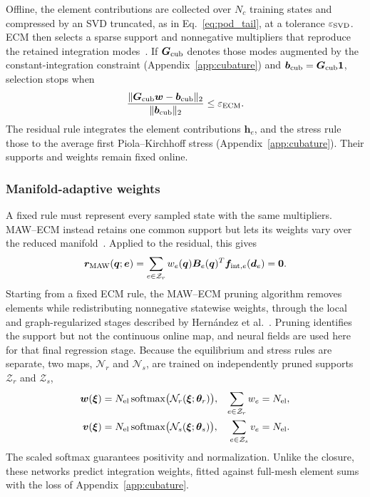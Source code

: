 Offline, the element contributions are collected over $N_c$ training states and compressed by an SVD truncated, as in Eq.~\eqref{eq:pod_tail}, at a tolerance $\varepsilon_{\rm SVD}$. ECM then selects a sparse support and nonnegative multipliers that reproduce the retained integration modes~\cite{hernandez2017}. If $\bm G_{\rm cub}$ denotes those modes augmented by the constant-integration constraint (Appendix~\ref{app:cubature}) and $\bm b_{\rm cub}=\bm G_{\rm cub}\bm1$, selection stops when
\begin{equation}
 \frac{\|\bm G_{\rm cub}\bm w-\bm b_{\rm cub}\|_2}
      {\|\bm b_{\rm cub}\|_2}\leq\varepsilon_{\rm ECM}.
 \label{eq:ecm_tolerance}
\end{equation}
The residual rule integrates the element contributions $\bm h_e$, and the stress rule those to the average first Piola--Kirchhoff stress (Appendix~\ref{app:cubature}). Their supports and weights remain fixed online.

\subsubsection{Manifold-adaptive weights}
\label{sec:adaptive_weights}
A fixed rule must represent every sampled state with the same multipliers. MAW--ECM instead retains one common support but lets its weights vary over the reduced manifold~\cite{hernandez2026dimensional}. Applied to the residual, this gives
\begin{equation}
 \bm r_{\rm MAW}(\bm q;\bm e)=
 \sum_{e\in\mathcal Z_r}w_e(\bm q)\bm B_e(\bm q)^T
                   \bm f_{{\rm int},e}(\bm d_e)=\bm0.
 \label{eq:maw}
\end{equation}
Starting from a fixed ECM rule, the MAW--ECM pruning algorithm removes elements while redistributing nonnegative statewise weights, through the local and graph-regularized stages described by Hernández et al.~\cite{hernandez2026dimensional}. Pruning identifies the support but not the continuous online map, and neural fields are used here for that final regression stage. Because the equilibrium and stress rules are separate, two maps, $\mathcal N_r$ and $\mathcal N_s$, are trained on independently pruned supports $\mathcal Z_r$ and $\mathcal Z_s$,
\begin{equation}
 \begin{aligned}
  \bm w(\bm\xi)&=N_{\rm el}\operatorname{softmax}
                 \bigl(\mathcal N_r(\bm\xi;\bm\theta_r)\bigr),
   &\sum_{e\in\mathcal Z_r}w_e&=N_{\rm el},\\
  \bm v(\bm\xi)&=N_{\rm el}\operatorname{softmax}
                 \bigl(\mathcal N_s(\bm\xi;\bm\theta_s)\bigr),
   &\sum_{e\in\mathcal Z_s}v_e&=N_{\rm el}.
 \end{aligned}
 \label{eq:softmax_weights}
\end{equation}
The scaled softmax guarantees positivity and normalization. Unlike the closure, these networks predict integration weights, fitted against full-mesh element sums with the loss of Appendix~\ref{app:cubature}.

